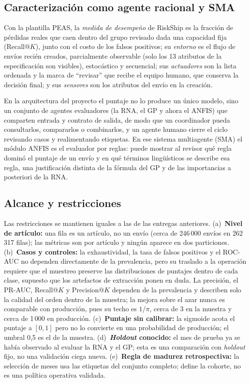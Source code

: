 \documentclass[conference]{IEEEtran}
\newcommand{\col}[1]{\texttt{\detokenize{#1}}}
\begin{document}
\subsection{Caracterización como agente racional y SMA}

Con la plantilla PEAS, la \emph{medida de desempeño} de RiskShip es la
fracción de pérdidas reales que caen dentro del grupo revisado dada una
capacidad fija (Recall@$K$), junto con el costo de los falsos positivos; su
\emph{entorno} es el flujo de envíos recién creados, parcialmente observable
(solo los 13 atributos de la especificación son visibles), estocástico y
secuencial; sus \emph{actuadores} son la lista ordenada y la marca de
``revisar'' que recibe el equipo humano, que conserva la decisión final; y sus
\emph{sensores} son los atributos del envío en la creación.

En la arquitectura del proyecto el puntaje no lo produce un único modelo, sino
un conjunto de agentes evaluadores (la RNA, el GP y ahora el ANFIS) que
comparten entrada y contrato de salida, de modo que un coordinador pueda
consultarlos, compararlos o combinarlos, y un agente humano cierre el ciclo
revisando casos y realimentando etiquetas. En ese sistema multiagente (SMA) el
módulo ANFIS es el evaluador por reglas: puede mostrar al revisor qué regla
dominó el puntaje de un envío y en qué términos lingüísticos se describe esa
regla, una justificación distinta de la fórmula del GP y de las importancias
a posteriori de la RNA.

\subsection{Alcance y restricciones}
\label{sec:alcance}

Las restricciones se mantienen iguales a las de las entregas anteriores.
(a)~\textbf{Nivel de artículo:} una fila es un artículo, no un envío (cerca de
246\,000 envíos en 262\,317 filas); las métricas son por artículo y ningún
\col{SHIPMENT_ID} aparece en dos particiones. (b)~\textbf{Casos y
controles:} la exhaustividad, la tasa de falsos positivos y el ROC-AUC no
dependen directamente de la prevalencia, pero su traslado a la operación
requiere que el muestreo preserve las distribuciones de puntajes dentro de
cada clase, supuesto que los artefactos de extracción ponen en duda. La
precisión, el PR-AUC, Recall@$K$ y Precision@$K$ dependen de la prevalencia
y describen solo la calidad del orden dentro de la muestra; la mejora sobre
el azar nunca es comparable con producción, pues su techo es $1/\pi$, cerca
de 3 en la muestra y cerca de 1\,000 en producción. (c)~\textbf{Puntaje sin
calibrar:} la sigmoide acota el puntaje a $[0,1]$ pero no lo convierte en una
probabilidad de producción; el umbral 0,5 es el de la muestra.
(d)~\textbf{\textit{Holdout} conocido:} el mes de prueba ya se había
observado al evaluar la RNA y el GP; esta es una comparación con
\textit{holdout} fijo, no una validación ciega nueva. (e)~\textbf{Regla de
madurez retrospectiva:} la selección de meses usa las etiquetas del conjunto
completo; define la cohorte, no es una política operativa validada.
\end{document}
